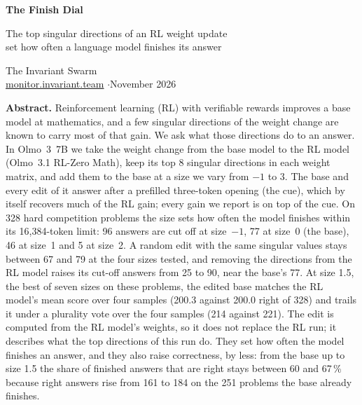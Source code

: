 \documentclass[10pt]{article}
\begin{document}
\begin{center}
{\sffamily\bfseries\LARGE The Finish Dial\par}
\vspace{0.4em}
{\sffamily\large The top singular directions of an RL weight update\\ set how often a language model finishes its answer\par}
\vspace{1.0em}
{\large The Invariant Swarm}\\[0.25em]
{\small \href{https://monitor.invariant.team}{monitor.invariant.team} \quad$\cdot$\quad November 2026}
\end{center}

\vspace{0.2em}
\begin{center}\begin{minipage}{0.88\textwidth}
\small
{\sffamily\bfseries Abstract.}
Reinforcement learning (RL) with verifiable rewards improves a base model at mathematics, and a few singular
directions of the weight change are known to carry most of that gain. We ask what those directions do to an answer.
In Olmo~3~7B we take the weight change from the base model to the RL model (Olmo~3.1 RL-Zero Math), keep its top 8
singular directions in each weight matrix, and add them to the base at a size we vary from $-1$ to $3$. The base
and every edit of it answer after a prefilled three-token opening (the cue), which by itself recovers much of the RL
gain; every gain we report is on top of the cue. On 328 hard competition problems the size sets how often the model
finishes within its 16{,}384-token limit: 96 answers are cut off at size~$-1$, 77 at size~0 (the base), 46 at
size~1 and 5 at size~2. A random edit with the same singular values stays between 67 and 79 at the four sizes tested,
and removing the directions from the RL model raises its cut-off answers from 25 to 90, near the base's 77. At size
1.5, the best of seven sizes on these problems, the edited base matches the RL model's mean score over four samples
(200.3 against 200.0 right of 328) and trails it under a plurality vote over the four samples (214 against 221).
The edit is computed from the RL model's weights, so it does not replace the RL run; it describes what the top
directions of this run do. They set how often the model finishes an answer, and they also raise correctness, by
less: from the base up to size 1.5 the share of finished answers that are right stays between 60 and 67\,\%
because right answers rise from 161 to 184 on the 251 problems the base already finishes.
\end{minipage}\end{center}
\vspace{0.1em}
\end{document}
